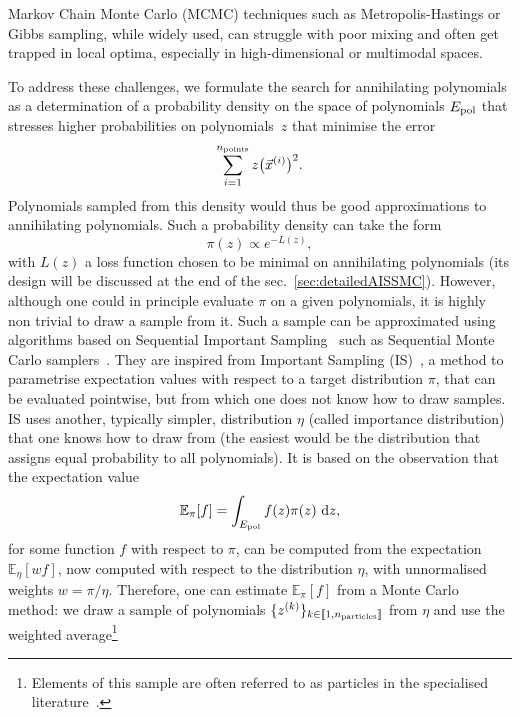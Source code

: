 \documentclass[11pt,a4paper]{article}
\renewcommand{\d}{\ensuremath{\mathrm{d}}\xspace}
\begin{document}
	Markov Chain Monte Carlo (MCMC) techniques such as Metropolis-Hastings or Gibbs sampling, while widely used, can struggle with poor mixing and often get trapped in local optima, especially in high-dimensional or multimodal spaces.

	To address these challenges, we formulate the search for annihilating polynomials as a determination of a probability density on the space of polynomials $E_{\rm pol}$ that stresses higher probabilities on polynomials~$z$ that minimise the error
	\begin{equation}
		\sum_{i=1}^{n_{\rm points}}z\big(\vec{x}^{(i)}\big)^{2}.
	\end{equation}
	Polynomials sampled from this density would thus be good approximations to annihilating polynomials. Such a probability density can take the form
	\begin{equation}
		\pi(z) \propto e^{-L(z)},
	\end{equation}
	with $L(z)$ a loss function chosen to be minimal on annihilating polynomials (its design will be discussed at the end of the sec.~\ref{sec:detailedAISSMC}). However, although one could in principle evaluate $\pi$ on a given polynomials, it is highly non trivial to draw a sample from it. Such a sample can be approximated using algorithms based on Sequential Important Sampling~\cite{Doucet2001,Liu2004} such as Sequential Monte Carlo samplers~\cite{del2006sequential}. They are inspired from Important Sampling (IS)~\cite{osti_4441935,RobertCasella2004}, a method to parametrise expectation values with respect to a target distribution $\pi$, that can be evaluated pointwise, but from which one does not know how to draw samples. IS uses another, typically simpler, distribution $\eta$ (called importance distribution) that one knows how to draw from (the easiest would be the distribution that assigns equal probability to all polynomials). It is based on the observation that the expectation value
	\begin{equation}
		\mathbb{E}_{\pi}[f] = \int_{E_{\rm pol}} f(z)\pi(z)\ \d z,
	\end{equation}
	for some function $f$ with respect to $\pi$, can be computed from the expectation $\mathbb{E}_{\eta}[w f]$, now computed with respect to the distribution $\eta$, with unnormalised weights $w = \pi/\eta$. Therefore, one can estimate $\mathbb{E}_{\pi}[f]$ from a Monte Carlo method: we draw a sample of polynomials $\{z^{(k)}\}_{k\in\llbracket 1, n_{\rm particles}\rrbracket}$ from $\eta$ and use the weighted average\footnote{Elements of this sample are often referred to as particles in the specialised literature~\cite{del2006sequential,DoucetTutorial,naesseth2024elementssequentialmontecarlo,Dai03072022}.}
\end{document}
